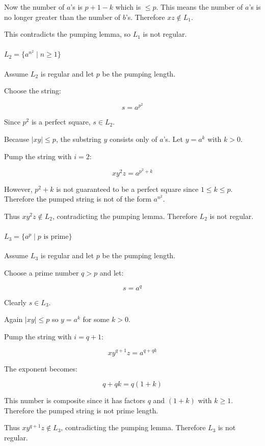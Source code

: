 \documentclass[11pt, a4paper]{article}
\theoremstyle{definition}
\theoremstyle{remark}
\begin{document}
Now the number of $a$'s is $p+1-k$ which is $\le p$. This means the number of $a$'s is no longer greater than the number of $b$'s. Therefore $xz \notin L_1$.

This contradicts the pumping lemma, so $L_1$ is not regular.

\paragraph{$L_2 = \{a^{n^2} \mid n \ge 1\}$}

Assume $L_2$ is regular and let $p$ be the pumping length.

Choose the string:

\[
s = a^{p^2}
\]

Since $p^2$ is a perfect square, $s \in L_2$.

Because $|xy| \le p$, the substring $y$ consists only of $a$'s. Let $y = a^k$ with $k>0$.

Pump the string with $i=2$:

\[
xy^2z = a^{p^2 + k}
\]

However, $p^2 + k$ is not guaranteed to be a perfect square since $1 \le k \le p$. Therefore the pumped string is not of the form $a^{n^2}$.

Thus $xy^2z \notin L_2$, contradicting the pumping lemma. Therefore $L_2$ is not regular.

\paragraph{$L_3 = \{a^p \mid p \text{ is prime}\}$}

Assume $L_3$ is regular and let $p$ be the pumping length.

Choose a prime number $q > p$ and let:

\[
s = a^q
\]

Clearly $s \in L_3$.

Again $|xy| \le p$ so $y = a^k$ for some $k>0$.

Pump the string with $i=q+1$:

\[
xy^{q+1}z = a^{q + qk}
\]

The exponent becomes:

\[
q + qk = q(1+k)
\]

This number is composite since it has factors $q$ and $(1+k)$ with $k \ge 1$. Therefore the pumped string is not prime length.

Thus $xy^{q+1}z \notin L_3$, contradicting the pumping lemma. Therefore $L_3$ is not regular.
\end{document}
